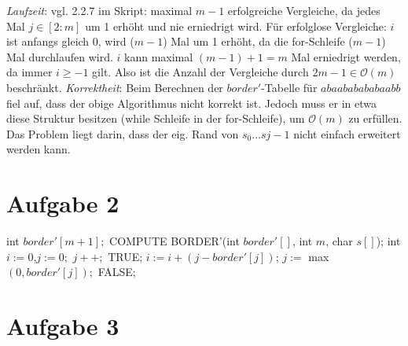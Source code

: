 \documentclass[a4paper,10pt,oneside,leqno]{scrartcl}
\begin{document}
\textit{Laufzeit}: vgl. 2.2.7 im Skript: maximal $m-1$ erfolgreiche Vergleiche, da jedes Mal $j\in [2 : m]$ um
1 erhöht und nie erniedrigt wird. Für erfolglose Vergleiche: $i$ ist anfangs gleich 0, wird ($m-1$)
Mal um 1 erhöht, da die for-Schleife ($m-1$) Mal durchlaufen wird. $i$ kann maximal $(m-1) + 1 = m$ Mal erniedrigt werden, da immer $i\geq -1$ gilt.
Also ist die Anzahl der Vergleiche durch $2m-1\in \mathcal{O}(m)$ beschränkt.\newline\newline
\textit{Korrektheit}: Beim Berechnen der $border'$-Tabelle für $abaababababaabb$ fiel auf, dass der obige Algorithmus nicht korrekt ist. Jedoch
muss er in etwa diese Struktur besitzen (while Schleife in der for-Schleife), um $\mathcal{O}(m)$ zu erfüllen. Das Problem liegt darin, dass der
eig. Rand von $s_0...s{j-1}$ nicht einfach erweitert werden kann.

\section*{Aufgabe 2}
\begin{algorithmic}
\State int $border'[m+1];$
\State COMPUTE BORDER'(int $border'[]$, int $m$, char $s[]$);
\State int $i := 0$,$j:=0;$
    \State $j++;$
     \State \Return TRUE;\EndIf
  \EndWhile
  \State $i := i + (j-border'[j])$;
  \State $j :=$ max$(0, border'[j]);$
\EndWhile
\State \Return FALSE;
\EndFunction
\end{algorithmic}
\section*{Aufgabe 3}
\end{document}
